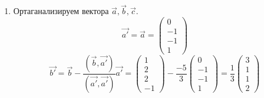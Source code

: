\documentclass[a4paper]{article}
\begin{document}
	\begin{enumerate}
		\item Ортаганализируем вектора $\overrightarrow{a}, \overrightarrow{b}, \overrightarrow{c}$.
		$$\overrightarrow{a'} = \overrightarrow{a}=\begin{pmatrix} 0 \\ -1 \\ -1 \\ 1 \end{pmatrix}$$
		$$\overrightarrow{b'}=\overrightarrow{b} - \dfrac{(\overrightarrow{b}, \overrightarrow{a'})}{(\overrightarrow{a'}, \overrightarrow{a'})}\overrightarrow{a'}= \begin{pmatrix} 1 \\ 2 \\ 2 \\ -1 \end{pmatrix} - \dfrac{-5}{3}\begin{pmatrix} 0 \\ -1 \\ -1 \\ 1 \end{pmatrix} = \dfrac{1}{3}\begin{pmatrix} 3 \\ 1 \\ 1 \\ 2 \end{pmatrix}$$
		

\end{enumerate}
\end{document}
